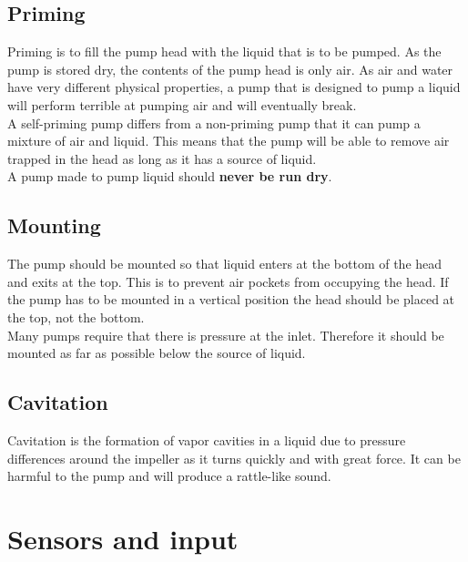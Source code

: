 \documentclass[11pt,fleqn]{book} %
\begin{document}
\section{Priming}

Priming is to fill the pump head with the liquid that is to be pumped. As the pump is stored dry, the contents of the pump head is only air. As air and water have very different physical properties, a pump that is designed to pump a liquid will perform terrible at pumping air and will eventually break.\\

A self-priming pump differs from a non-priming pump that it can pump a mixture of air and liquid. This means that the pump will be able to remove air trapped in the head as long as it has a source of liquid.\\

A pump made to pump liquid should \textbf{never be run dry}.

\section{Mounting}

The pump should be mounted so that liquid enters at the bottom of the head and exits at the top. This is to prevent air pockets from occupying the head. If the pump has to be mounted in a vertical position the head should be placed at the top, not the bottom.\\

Many pumps require that there is pressure at the inlet. Therefore it should be mounted as far as possible below the source of liquid.

\section{Cavitation}

Cavitation is the formation of vapor cavities in a liquid due to pressure differences around the impeller as it turns quickly and with great force. It can be harmful to the pump and will produce a rattle-like sound.



\chapter{Sensors and input}
\end{document}
